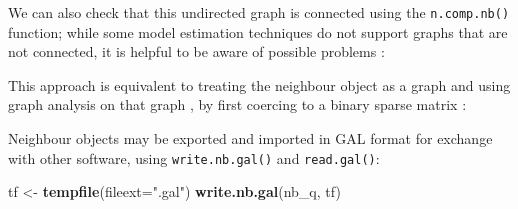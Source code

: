 \documentclass[]{book}
\newenvironment{Shaded}{\begin{snugshade}}{\end{snugshade}}
\newcommand{\CommentTok}[1]{\textcolor[rgb]{0.56,0.35,0.01}{\textit{#1}}}
\newcommand{\DataTypeTok}[1]{\textcolor[rgb]{0.13,0.29,0.53}{#1}}
\newcommand{\KeywordTok}[1]{\textcolor[rgb]{0.13,0.29,0.53}{\textbf{#1}}}
\newcommand{\NormalTok}[1]{#1}
\newcommand{\OperatorTok}[1]{\textcolor[rgb]{0.81,0.36,0.00}{\textbf{#1}}}
\newcommand{\OtherTok}[1]{\textcolor[rgb]{0.56,0.35,0.01}{#1}}
\newcommand{\StringTok}[1]{\textcolor[rgb]{0.31,0.60,0.02}{#1}}
\begin{document}
We can also check that this undirected graph is connected using the \texttt{n.comp.nb()} function; while some model estimation techniques do not support graphs that are not connected, it is helpful to be aware of possible problems \citep{FRENISTERRANTINO201825}:

\begin{Shaded}
\end{Shaded}

This approach is equivalent to treating the neighbour object as a graph and using graph analysis on that graph \citep{csardi+nepusz:06, R-igraph}, by first coercing to a binary sparse matrix \citep{R-Matrix}:

\begin{Shaded}
\end{Shaded}

Neighbour objects may be exported and imported in GAL format for exchange with other software, using \texttt{write.nb.gal()} and \texttt{read.gal()}:

\begin{Shaded}
\begin{Highlighting}[]
\NormalTok{tf <-}\StringTok{ }\KeywordTok{tempfile}\NormalTok{(}\DataTypeTok{fileext=}\StringTok{".gal"}\NormalTok{)}
\KeywordTok{write.nb.gal}\NormalTok{(nb_q, tf)}
\end{Highlighting}
\end{Shaded}
\end{document}
